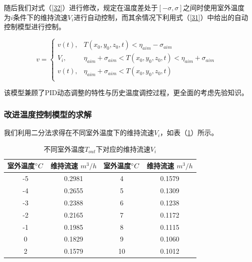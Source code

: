 \documentclass{my_paper}
\begin{document}
随后我们对式（\ref{32}）进行修改，规定在温度差处于$[-\sigma , \sigma] $之间时使用室外温度为$i$条件下的维持流速$V_i$进行自动控制，而其余情况下利用式（\ref{31}）中给出的自动控制模型进行控制。

\begin{equation}
    v = \begin{cases}
        v(t),&T(x_0,y_0,z_0,t)<\eta_{aim}-\sigma_{aim}\\
        V_i,&\eta_{aim}+\sigma_{aim}<T(x_0,y_0,z_0,t)<\eta_{aim}+\sigma_{aim}\\
        v(t),&\eta_{aim}+\sigma_{aim}<T(x_0,y_0,z_0,t)\\
    \end{cases}
    \label{34}
    \end{equation}

该模型兼顾了PID动态调整的特性与历史温度调控过程，更全面的考虑先验知识。
\newpage
\subsubsection{改进温度控制模型的求解}

我们利用二分法求得在不同室外温度下的维持流速$V_i$，如表（\ref{b1}）所示。
\begin{table}[ht]
\centering
\caption{不同室外温度$T_{out}$下对应的维持流速$V_i$}
\begin{tabular}{cc|cc}
\toprule
室外温度$\degree C$ & 维持流速 $m^3/h$ & 室外温度$\degree C$ & 维持流速 $m^3/h$   \\ \midrule
   -5         &0.2981&4&0.1579 \\
    -4        &0.2655&5&0.1309 \\
      -3      &0.2388&6&0.1238 \\
         -2   &0.2165&7&0.1172 \\
         -1&0.1985&8&0.1115\\
         0&0.1829&9&0.1060\\

         2&0.1579&10&0.1012\\
\bottomrule
\end{tabular}

\label{b1}
  \end{table}
\end{document}
